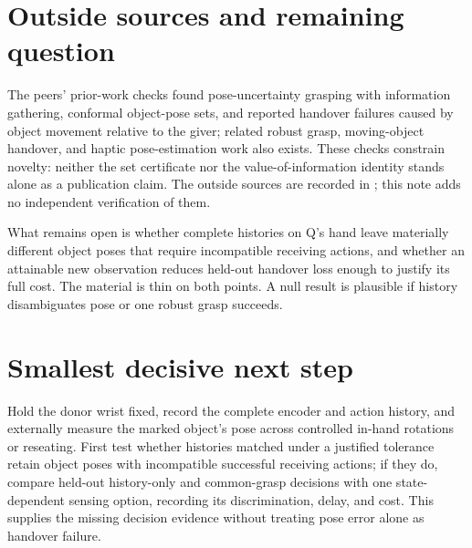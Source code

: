 \documentclass{article}
\begin{document}
\section{Outside sources and remaining question}

The peers' prior-work checks found pose-uncertainty grasping with information gathering, conformal object-pose sets, and reported handover failures caused by object movement relative to the giver; related robust grasp, moving-object handover, and haptic pose-estimation work also exists. These checks constrain novelty: neither the set certificate nor the value-of-information identity stands alone as a publication claim. The outside sources are recorded in ; this note adds no independent verification of them.

What remains open is whether complete histories on Q's hand leave materially different object poses that require incompatible receiving actions, and whether an attainable new observation reduces held-out handover loss enough to justify its full cost. The material is thin on both points. A null result is plausible if history disambiguates pose or one robust grasp succeeds. 

\section{Smallest decisive next step}

Hold the donor wrist fixed, record the complete encoder and action history, and externally measure the marked object's pose across controlled in-hand rotations or reseating. First test whether histories matched under a justified tolerance retain object poses with incompatible successful receiving actions; if they do, compare held-out history-only and common-grasp decisions with one state-dependent sensing option, recording its discrimination, delay, and cost. This supplies the missing decision evidence without treating pose error alone as handover failure. 
\end{document}
